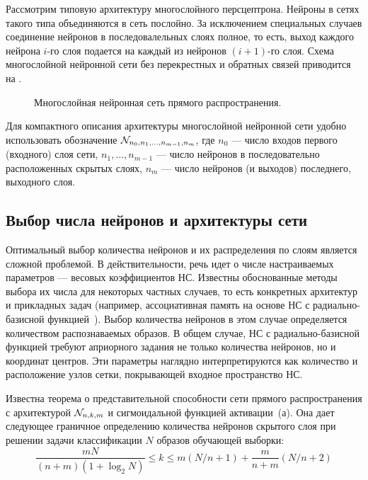 Рассмотрим типовую архитектуру многослойного персцептрона.  Нейроны в
сетях такого типа объединяются в сеть послойно.  За исключением
специальных случаев соединение нейронов в последовалельных слоях
полное, то есть, выход каждого нейрона $i$-го слоя подается на каждый
из нейронов $(i+1)$-го слоя.  Схема многослойной нейронной сети без
перекрестных и обратных связей приводится на .

\begin{figure}[h]
\centering
%

\caption{Многослойная нейронная сеть прямого распространения.}
\label{fig:mlann}
\end{figure}

Для компактного описания архитектуры многослойной нейронной сети
удобно использовать обозначение $\mathcal{N}_{n_0,n_1,\ldots,n_{m-1},n_m}$,
где $n_0$ --- число входов первого (входного) слоя сети,
$n_1,\ldots,n_{m-1}$ --- число нейронов в последовательно
расположенных скрытых слоях, $n_m$ --- число нейронов (и выходов)
последнего, выходного слоя.

\subsection{Выбор числа нейронов и архитектуры сети}

Оптимальный выбор количества нейронов и их распределения по слоям
является сложной проблемой.  В действительности, речь идет о числе
настраиваемых параметров --- весовых коэффициентов НС.  Известны
обоснованные методы выбора их числа для некоторых частных случаев, то
есть конкретных архитектур и прикладных задач (например, ассоциативная
память на основе НС с радиально-базисной функцией~\cite{koh80}).
Выбор количества нейронов в этом случае определяется количеством
распознаваемых образов.  В общем случае, НС с радиально-базисной
функцией требуют априорного задания не только количества нейронов, но
и координат центров.  Эти параметры наглядно интерпретируются как
количество и расположение узлов сетки, покрывающей входное
пространство НС.

Известна теорема  о представительной
способности сети прямого распространения с архитектурой $\mathcal{N}_{n,k,m}$
и сигмоидальной функцией активации~(а).  Она дает
следующее граничное определению количества нейронов скрытого слоя при
решении задачи классификации $N$ образов обучающей выборки:
\begin{equation}\label{eq:neuron-number}
\displaystyle\frac{mN}{(n+m)(1+\log_2N)} \le k \le
m(N/n+1)+\displaystyle\frac{m}{n+m}(N/n+2)
\end{equation}

